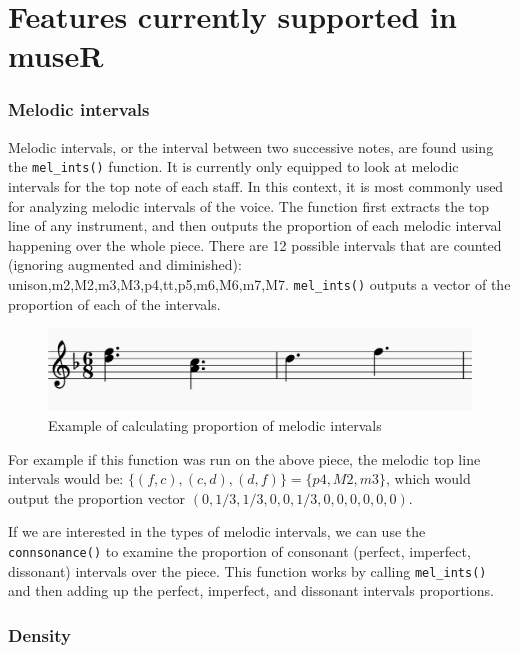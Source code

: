 \documentclass[12pt,twoside]{reedthesis}
\theoremstyle{definition}
\theoremstyle{definition}
\theoremstyle{definition}
\theoremstyle{remark}
\begin{document}
\section{Features currently supported in
museR}\label{features-currently-supported-in-muser}

\subsubsection{Melodic intervals}\label{melodic-intervals}

Melodic intervals, or the interval between two successive notes, are
found using the \texttt{mel\_ints()} function. It is currently only
equipped to look at melodic intervals for the top note of each staff. In
this context, it is most commonly used for analyzing melodic intervals
of the voice. The function first extracts the top line of any
instrument, and then outputs the proportion of each melodic interval
happening over the whole piece. There are 12 possible intervals that are
counted (ignoring augmented and diminished):
unison,m2,M2,m3,M3,p4,tt,p5,m6,M6,m7,M7. \texttt{mel\_ints()} outputs a
vector of the proportion of each of the intervals.
\begin{figure}[h]
\centering
\includegraphics[scale = .5]{images/ex2.png}
\caption{Example of calculating proportion of melodic intervals}
\label{subd}
\end{figure}
For example if this function was run on the above piece, the melodic top
line intervals would be: \(\{(f,c),(c,d),(d,f)\} = \{p4,M2,m3\}\), which
would output the proportion vector \((0,1/3,1/3,0,0,1/3,0,0,0,0,0,0)\).

If we are interested in the types of melodic intervals, we can use the
\texttt{connsonance()} to examine the proportion of consonant (perfect,
imperfect, dissonant) intervals over the piece. This function works by
calling \texttt{mel\_ints()} and then adding up the perfect, imperfect,
and dissonant intervals proportions.

\subsubsection{Density}\label{density}
\end{document}
